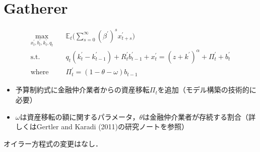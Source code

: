 \documentclass[dvipdfmx]{jlreq}
\begin{document}
\section{Gatherer}
\begin{align}
  \max_{x^\prime_t, b^\prime_t, k^\prime_t, q_t} \quad & \mathbb{E}_t \bigg( \sum_{s=0}^{\infty} (\beta^\prime)^s x^\prime_{t+s} \bigg) \label{eq:g_u} \\
  \text{s.t.} \quad & q_t(k^\prime_t - k^\prime_{t-1}) + R^\prime_t b^\prime_{t-1} + x^\prime_t = (z+k^\prime)^\alpha + \Pi^\prime_t + b^\prime_t \label{eq:g_yosan} \\
  \text{where} \quad & \Pi^\prime_t = (1-\theta-\omega) b_{t-1}
\end{align}
\begin{itemize}
  \item 予算制約式に金融仲介業者からの資産移転$\Pi_t$を追加（モデル構築の技術的に必要）
  \item $\omega$は資産移転の額に関するパラメータ，$\theta$は金融仲介業者が存続する割合（詳しくはGertler and Karadi (2011)の研究ノートを参照）
\end{itemize}
オイラー方程式の変更はなし．
\end{document}
